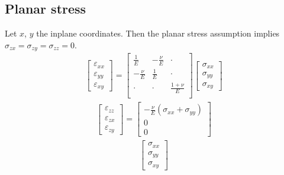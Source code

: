 \documentclass[letterpaper,10pt,english]{jupyterBook}
\begin{document}
\subsection{Planar stress}
\label{\detokenize{ch/solids/plates-shells/stress-strain-state:planar-stress}}\label{\detokenize{ch/solids/plates-shells/stress-strain-state:solid-mechanics-small-displacements-plates-shells-stress-strain-state-planar-stress}}
\sphinxAtStartPar
Let \(x\), \(y\) the in\sphinxhyphen{}plane coordinates. Then the planar stress assumption implies \(\sigma_{zx} = \sigma_{zy} = \sigma_{zz} = 0\).
\begin{equation*}
\begin{split}
\begin{bmatrix} \varepsilon_{xx} \\ \varepsilon_{yy} \\ \varepsilon_{xy} \end{bmatrix}
=
\begin{bmatrix}
 \frac{ 1 }{E} &-\frac{\nu}{E} & \cdot \\
-\frac{\nu}{E} & \frac{ 1 }{E} & \cdot \\
 \cdot & \cdot &         \frac{1+\nu}{E} \\
\end{bmatrix}
\begin{bmatrix} \sigma_{xx} \\ \sigma_{yy} \\ \sigma_{xy} \end{bmatrix}
\end{split}
\end{equation*}\begin{equation*}
\begin{split}
\begin{bmatrix} \varepsilon_{zz} \\ \varepsilon_{zx} \\ \varepsilon_{zy} \end{bmatrix}
=
\begin{bmatrix} - \frac{\nu}{E} ( \sigma_{xx} + \sigma_{yy} ) \\ 0 \\ 0 \end{bmatrix}
\end{split}
\end{equation*}\begin{equation*}
\begin{split}
\begin{bmatrix} \sigma_{xx} \\ \sigma_{yy} \\ \sigma_{xy} \end{bmatrix}

\end{split}
\end{equation*}
\end{document}
